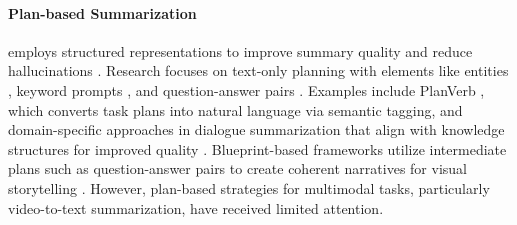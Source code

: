 \paragraph{Plan-based Summarization} employs structured representations to improve summary quality and reduce hallucinations \cite{narayan-etal-2021-planning, amplayo2021unsupervised, wang-etal-2022-guiding, narayan-etal-2023-conditional}. Research focuses on text-only planning with elements like entities \cite{narayan-etal-2021-planning, liu-chen-2021-controllable, huot-etal-2024-mplan}, keyword prompts \cite{creo2023prompting}, and question-answer pairs \cite{narayan-etal-2023-conditional}. Examples include PlanVerb \cite{canal2022planverb}, which converts task plans into natural language via semantic tagging, and domain-specific approaches in dialogue summarization that align with knowledge structures for improved quality \cite{srivastava-etal-2024-knowledge}. Blueprint-based frameworks utilize intermediate plans such as question-answer pairs to create coherent narratives for visual storytelling \cite{liu-etal-2023-visual-storytelling}. However, plan-based strategies for multimodal tasks, particularly video-to-text summarization, have received limited attention.